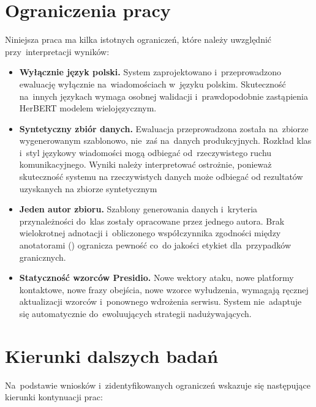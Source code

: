 \section{Ograniczenia pracy}
\label{sec:ograniczenia}

Niniejsza praca ma kilka istotnych ograniczeń, które należy uwzględnić
przy~interpretacji wyników:

\begin{itemize}
  \item \textbf{Wyłącznie język polski.} System zaprojektowano i~przeprowadzono ewaluację wyłącznie
    na~wiadomościach w~języku polskim. Skuteczność na~innych językach wymaga
    osobnej walidacji i~prawdopodobnie zastąpienia HerBERT modelem wielojęzycznym.

  \item \textbf{Syntetyczny zbiór danych.} Ewaluacja przeprowadzona została
    na~zbiorze wygenerowanym szablonowo, nie~zaś na~danych produkcyjnych.
    Rozkład klas i~styl językowy wiadomości mogą odbiegać od~rzeczywistego
    ruchu komunikacyjnego. Wyniki należy interpretować ostrożnie, ponieważ skuteczność systemu na rzeczywistych danych może odbiegać od rezultatów uzyskanych na zbiorze syntetycznym

  \item \textbf{Jeden autor zbioru.} Szablony generowania danych i~kryteria
    przynależności do~klas zostały opracowane przez jednego autora.
    Brak wielokrotnej adnotacji i~obliczonego współczynnika zgodności
    między anotatorami () ogranicza pewność
    co~do jakości etykiet dla~przypadków granicznych.


  \item \textbf{Statyczność wzorców Presidio.} Nowe wektory ataku,
    nowe platformy kontaktowe, nowe frazy obejścia, nowe wzorce wyłudzenia,
    wymagają ręcznej aktualizacji wzorców i~ponownego wdrożenia serwisu.
    System nie~adaptuje się automatycznie do~ewoluujących strategii nadużywających.
\end{itemize}

\section{Kierunki dalszych badań}
\label{sec:kierunki}

Na~podstawie wniosków i~zidentyfikowanych ograniczeń wskazuje się
następujące kierunki kontynuacji prac:

